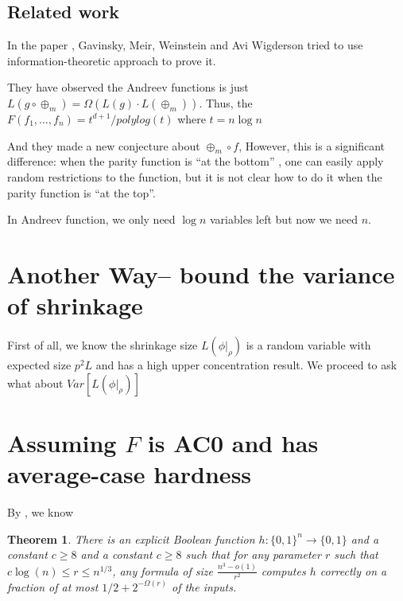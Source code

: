 \documentclass[12pt]{article}
\newtheorem{theorem}{Theorem}[section]
\renewcommand{\.}{,\ldots,}
\begin{document}
\subsection{Related work}
In the paper \cite{gavinsky2014toward},  Gavinsky, Meir, Weinstein and Avi Wigderson tried to use information-theoretic approach to prove it.  

They have observed the Andreev functions is just 
$L(g \circ \oplus_m) = \Omega( L(g) \cdot L(\oplus_m)).$
Thus, the $F(f_1\.f_n)=t^{d+1}/polylog (t)$ where $t=n\log n$

And they made a new conjecture about $\oplus_m\circ f$, However, this is a significant difference:
when the parity function is “at the bottom” , one can easily apply random restrictions
to the function, but it is not clear how to do it when the parity function is “at the top”.



In Andreev function, we only need $\log n$ variables left but now we need $n$. 


\section{Another Way-- bound the variance of shrinkage}
First of all, we know the shrinkage size $L(\phi|_{\rho})$ is a random variable with expected size $p^2L$ and has a high upper concentration result. We proceed to ask what about $Var[L(\phi|_\rho)]$

\section{Assuming $F$ is AC0 and has average-case hardness }
\label{sec:AC0} 
By \cite{komargodski2013improved}, we know 
\begin{theorem}
There is an explicit Boolean function $h:\{0,1\}^n\rightarrow \{0,1\}$ and a constant $c\geq 8$ and a constant $c\geq 8$ such that for  any parameter $r$ such that $c\log(n)\leq r\le n^{1/3}$, any formula of size $\frac{n^3-o(1)}{r^2}$ computes $h$ correctly on a fraction of at most $1/2+2^{-\Omega(r)}$ of the inputs. 
\end{theorem}
\end{document}
